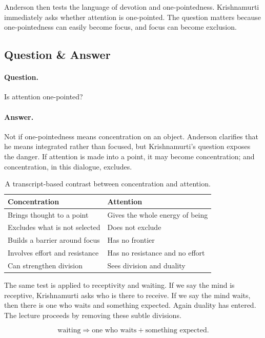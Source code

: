 Anderson then tests the language of devotion and one-pointedness. Krishnamurti immediately asks whether attention is one-pointed. The question matters because one-pointedness can easily become focus, and focus can become exclusion.

\subsection{Question \& Answer}

\paragraph{Question.}
Is attention one-pointed?

\paragraph{Answer.}
Not if one-pointedness means concentration on an object. Anderson clarifies that he means integrated rather than focused, but Krishnamurti's question exposes the danger. If attention is made into a point, it may become concentration; and concentration, in this dialogue, excludes.

\begin{table}
\centering
\begin{tabular}{|p{.42\linewidth}|p{.42\linewidth}|}
\hline
\textbf{Concentration} & \textbf{Attention} \\
\hline
Brings thought to a point & Gives the whole energy of being \\
\hline
Excludes what is not selected & Does not exclude \\
\hline
Builds a barrier around focus & Has no frontier \\
\hline
Involves effort and resistance & Has no resistance and no effort \\
\hline
Can strengthen division & Sees division and duality \\
\hline
\end{tabular}
\caption{A transcript-based contrast between concentration and attention.}
\end{table}

The same test is applied to receptivity and waiting. If we say the mind is receptive, Krishnamurti asks who is there to receive. If we say the mind waits, then there is one who waits and something expected. Again duality has entered. The lecture proceeds by removing these subtle divisions.

\begin{equation}
\text{waiting}
\Rightarrow
\text{one who waits}+\text{something expected}.
\end{equation}

